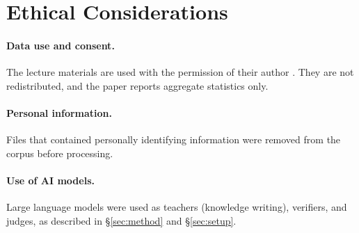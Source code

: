 \section*{Ethical Considerations}

\paragraph{Data use and consent.}
The lecture materials are used with the permission of their author .
They are not redistributed, and the paper reports aggregate statistics only.

\paragraph{Personal information.}
Files that contained personally identifying information were removed from the corpus before processing.

\paragraph{Use of AI models.}
Large language models were used as teachers (knowledge writing), verifiers, and judges, as described in \S\ref{sec:method} and \S\ref{sec:setup}.
